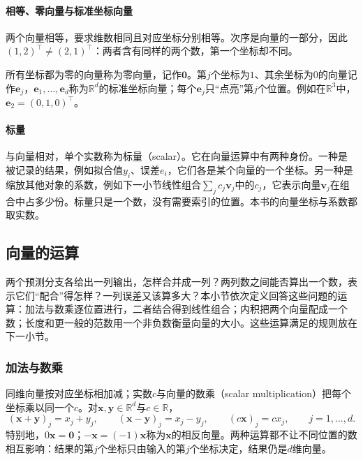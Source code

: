 \paragraph{相等、零向量与标准坐标向量}
两个向量相等，要求维数相同且对应坐标分别相等。次序是向量的一部分，因此$(1,2)^\top\neq(2,1)^\top$：两者含有同样的两个数，第一个坐标却不同。

所有坐标都为零的向量称为零向量，记作$\bm0$。第$j$个坐标为$1$、其余坐标为$0$的向量记作$\bm e_j$，$\bm e_1,\ldots,\bm e_d$称为$\mathbb R^d$的标准坐标向量；每个$\bm e_j$只“点亮”第$j$个位置。例如在$\mathbb R^3$中，$\bm e_2=(0,1,0)^\top$。

\paragraph{标量}
\label{sec:ls-scalars}
与向量相对，单个实数称为标量（scalar）。它在向量运算中有两种身份。一种是被记录的结果，例如拟合值$y_i$、误差$e_i$，它们各是某个向量的一个坐标。另一种是缩放其他对象的系数，例如下一小节线性组合$\sum_j c_j\bm v_j$中的$c_j$，它表示向量$\bm v_j$在组合中占多少份。标量只是一个数，没有需要索引的位置。本书的向量坐标与系数都取实数。

\subsection{向量的运算}
\label{sec:ls-vector-operations}

两个预测分支各给出一列输出，怎样合并成一列？两列数之间能否算出一个数，表示它们“配合”得怎样？一列误差又该算多大？本小节依次定义回答这些问题的运算：加法与数乘逐位置进行，二者结合得到线性组合；内积把两个向量配成一个数；长度和更一般的范数用一个非负数衡量向量的大小。这些运算满足的规则放在下一小节。

\subsubsection{加法与数乘}
\label{sec:ls-addition-scaling}

同维向量按对应坐标相加减；实数$c$与向量的数乘（scalar multiplication）把每个坐标乘以同一个$c$。对$\bm x,\bm y\in\mathbb R^d$与$c\in\mathbb R$，
\[
 (\bm x+\bm y)_j=x_j+y_j,\qquad
 (\bm x-\bm y)_j=x_j-y_j,\qquad
 (c\bm x)_j=cx_j,\qquad j=1,\ldots,d.
\]
特别地，$0\bm x=\bm0$；$-\bm x=(-1)\bm x$称为$\bm x$的相反向量。两种运算都不让不同位置的数相互影响：结果的第$j$个坐标只由输入的第$j$个坐标决定，结果仍是$d$维向量。

